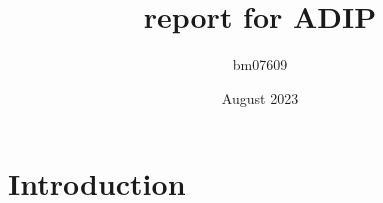 \documentclass{article}
\title{report for ADIP}
\author{bm07609 }
\date{August 2023}
\begin{document}
\maketitle

\section{Introduction}
\end{document}
